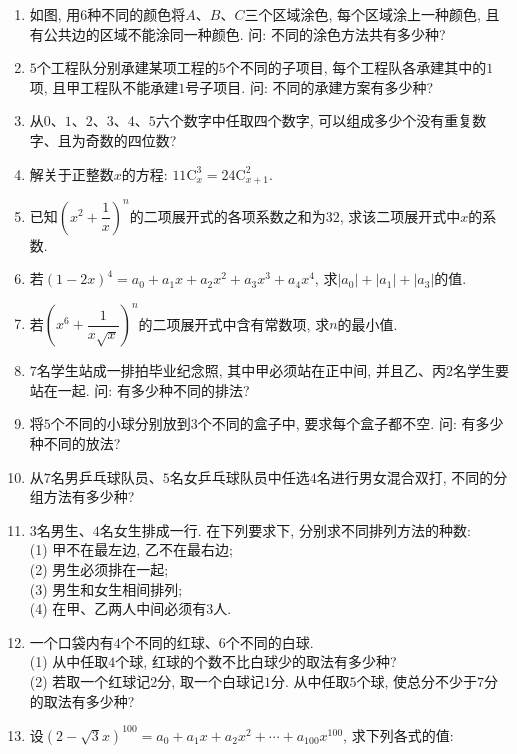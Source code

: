 \documentclass[10pt,a4paper]{article}
\begin{document}
\begin{enumerate}[1.]
\item 如图, 用$6$种不同的颜色将$A$、$B$、$C$三个区域涂色, 每个区域涂上一种颜色, 且有公共边的区域不能涂同一种颜色. 问: 不同的涂色方法共有多少种?
\begin{center}
\end{center}
\item $5$个工程队分别承建某项工程的$5$个不同的子项目, 每个工程队各承建其中的$1$项, 且甲工程队不能承建$1$号子项目. 问: 不同的承建方案有多少种?
\item 从$0$、$1$、$2$、$3$、$4$、$5$六个数字中任取四个数字, 可以组成多少个没有重复数字、且为奇数的四位数?
\item 解关于正整数$x$的方程: $11\mathrm{C}_x^3=24\mathrm{C}_{x+1}^2$.
\item 已知$(x^2+\dfrac 1x)^n$的二项展开式的各项系数之和为$32$, 求该二项展开式中$x$的系数.
\item 若$(1-2x)^4=a_0+a_1x+a_2x^2+a_3x^3+a_4x^4$, 求$|a_0|+|a_1|+|a_3|$的值.
\item 若$(x^6+\dfrac 1{x\sqrt x})^n$的二项展开式中含有常数项, 求$n$的最小值.
\item $7$名学生站成一排拍毕业纪念照, 其中甲必须站在正中间, 并且乙、丙$2$名学生要站在一起. 问: 有多少种不同的排法?
\item 将$5$个不同的小球分别放到$3$个不同的盒子中, 要求每个盒子都不空. 问: 有多少种不同的放法?
\item 从$7$名男乒乓球队员、$5$名女乒乓球队员中任选$4$名进行男女混合双打, 不同的分组方法有多少种?
\item $3$名男生、$4$名女生排成一行. 在下列要求下, 分别求不同排列方法的种数:\\
(1) 甲不在最左边, 乙不在最右边;\\
(2) 男生必须排在一起;\\
(3) 男生和女生相间排列;\\
(4) 在甲、乙两人中间必须有$3$人.
\item 一个口袋内有$4$个不同的红球、$6$个不同的白球.\\
(1) 从中任取$4$个球, 红球的个数不比白球少的取法有多少种?\\
(2) 若取一个红球记$2$分, 取一个白球记$1$分. 从中任取$5$个球, 使总分不少于$7$分的取法有多少种?
\item 设$(2-\sqrt 3x)^{100}=a_0+a_1x+a_2x^2+\cdots+a_{100}x^{100}$, 求下列各式的值:\\

\end{enumerate}
\end{document}
